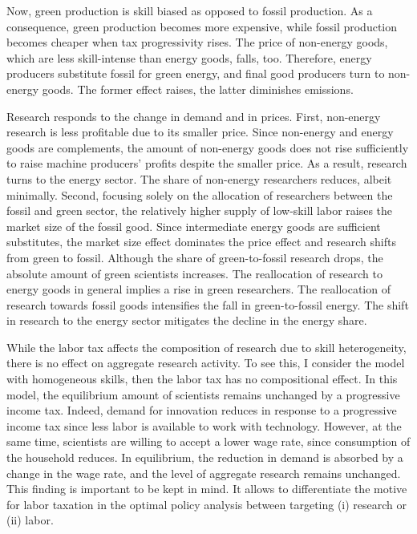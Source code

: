  Now, green production is skill biased as opposed to fossil production.
 As a  consequence, green production becomes more expensive, while fossil production becomes cheaper when tax progressivity rises. The price of non-energy goods, which are less skill-intense than energy goods, falls, too. Therefore, energy producers substitute fossil for green energy, and final good producers turn to non-energy goods. The former effect raises, the latter diminishes emissions.
 
 
 Research responds to the change in demand and in prices. First, non-energy research is less profitable due to its smaller price. Since non-energy and energy goods are complements, the amount of non-energy goods does not rise sufficiently to raise machine producers' profits despite the smaller price. As a result, research turns to the energy sector. The share of non-energy researchers reduces, albeit minimally. %
 Second, focusing solely on the allocation of researchers between the fossil and green sector, the relatively higher supply of low-skill labor raises the market size of the fossil good. Since intermediate energy goods are sufficient substitutes, the market size effect dominates the price effect and research shifts from green to fossil.
 Although the share of green-to-fossil research drops, the absolute amount of green scientists increases. The reallocation of research to energy goods in general implies a rise in green researchers. The reallocation of research towards fossil goods intensifies the fall in green-to-fossil energy. The shift in research to the energy sector mitigates the decline in the energy share. 
 
 While the labor tax affects the composition of research due to skill heterogeneity, there is no effect on aggregate research activity. 
 To see this, I consider the model with homogeneous skills, then the labor tax has no compositional effect. In this model, the equilibrium amount of scientists remains unchanged by a progressive income tax. Indeed, demand for innovation reduces in response to a progressive income tax since less labor is available to work with technology. However, at the same time, scientists are willing to accept a lower wage rate, since consumption of the household reduces. In equilibrium, the reduction in demand is absorbed by a change in the wage rate, and the level of aggregate research remains unchanged. 
 This finding is important to be kept in mind. It allows to differentiate the motive for labor taxation in the optimal policy analysis between  targeting (i) research or (ii) labor. 
 
